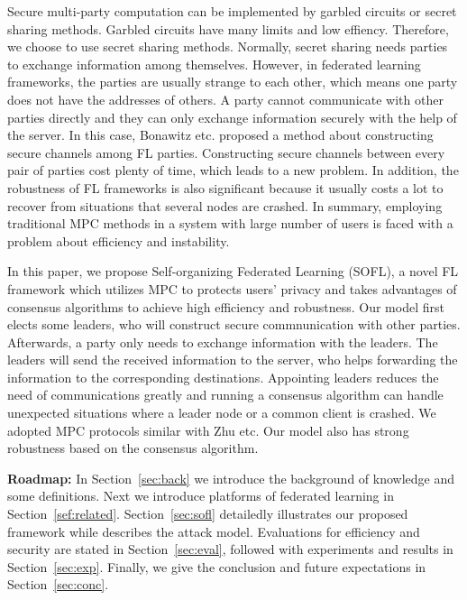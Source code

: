 Secure multi-party computation can be implemented by garbled circuits or secret sharing methods\cite{Shamir}. Garbled circuits have many limits and low effiency. Therefore, we choose to use secret sharing methods. Normally, secret sharing needs parties to exchange information among themselves. However, in federated learning frameworks, the parties are usually strange to each other, which means one party does not have the addresses of others. A party cannot communicate with other parties directly and they can only exchange information securely with the help of the server. In this case, Bonawitz etc.\cite{Practical} proposed a method about constructing secure channels among FL parties. Constructing secure channels between every pair of parties cost plenty of time, which leads to a new problem. In addition, the robustness of FL frameworks is also significant because it usually costs a lot to recover from situations that several nodes are crashed. In summary, employing traditional MPC methods in a system with large number of users is faced with a problem about efficiency and instability.

In this paper, we propose Self-organizing Federated Learning (SOFL), a novel FL framework which utilizes MPC to protects users' privacy and takes advantages of consensus algorithms to achieve high efficiency and robustness. Our model first elects some leaders, who will construct secure commnunication with other parties. Afterwards, a party only needs to exchange information with the leaders. The leaders will send the received information to the server, who helps forwarding the information to the corresponding destinations. Appointing leaders reduces the need of communications greatly and running a consensus algorithm can handle unexpected situations where a leader node or a common client is crashed. We adopted MPC protocols similar with Zhu etc\cite{Weighted}. Our model also has strong robustness based on the consensus algorithm. 

\textbf{Roadmap:} In Section~\ref{sec:back} we introduce the background of knowledge and some definitions. Next we introduce platforms of federated learning in Section~\ref{sef:related}. Section~\ref{sec:sofl} detailedly illustrates our proposed framework while describes the attack model. Evaluations for efficiency and security are stated in Section~\ref{sec:eval}, followed with experiments and results in Section~\ref{sec:exp}. Finally, we give the conclusion and future expectations in Section~\ref{sec:conc}.